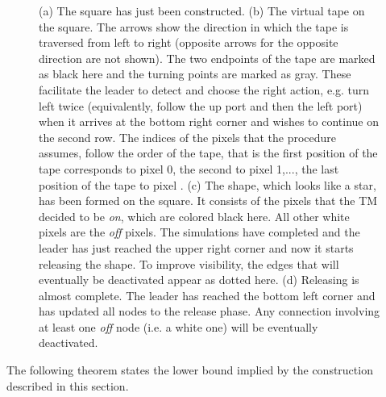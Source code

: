 \documentclass[oribibl, 11pt]{llncs}
\begin{document}
\begin{figure}[!hbtp]
   \caption{(a) The  square has just been constructed. (b) The virtual tape on the square. The arrows show the direction in which the tape is traversed from left to right (opposite arrows for the opposite direction are not shown). The two endpoints of the tape are marked as black here and the turning points are marked as gray. These facilitate the leader to detect and choose the right action, e.g. turn left twice (equivalently, follow the up port and then the left port) when it arrives at the bottom right corner and wishes to continue on the second row. The indices of the pixels that the procedure assumes, follow the order of the tape, that is the first position of the tape corresponds to pixel 0, the second to pixel 1,..., the last position of the tape to pixel . (c) The shape, which looks like a star, has been formed on the square. It consists of the pixels that the TM  decided to be \emph{on}, which are colored black here. All other white pixels are the \emph{off} pixels. The simulations have completed and the leader has just reached the upper right corner and now it starts releasing the shape. To improve visibility, the edges that will eventually be deactivated appear as dotted here. (d) Releasing is almost complete. The leader has reached the bottom left corner and has updated all nodes to the release phase. Any connection involving at least one \emph{off} node (i.e. a white one) will be eventually deactivated.} \label{fig:shape}
\end{figure}

The following theorem states the lower bound implied by the construction described in this section.
\end{document}
